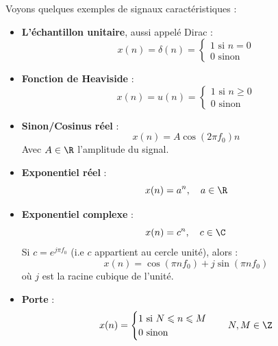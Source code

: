 \begin{example}
    Voyons quelques exemples de signaux caractéristiques : 
    \begin{itemize}
        \item \textbf{L'échantillon unitaire}, aussi appelé Dirac : 
            \begin{equation}
                x(n) = \delta(n) = 
                    \begin{cases}
                        1 \text{ si } n = 0 \\ 
                        0 \text{ sinon } 
                    \end{cases}
            \end{equation}
        \item \textbf{Fonction de Heaviside} : 
            \begin{equation}
                x(n) = u(n) = 
                    \begin{cases}
                        1 \text{ si }n \geqslant 0 \\
                        0 \text{ sinon}  
                    \end{cases}
            \end{equation}
        \item \textbf{Sinon/Cosinus réel} : 
            \begin{equation}
                x(n) = A \cos (2 \pi f_0)n 
            \end{equation}
            Avec $A \in \R$ l'amplitude du signal. 
        \item \textbf{Exponentiel réel} : 
            \begin{equation}
                x(n) = a^n, \quad a \in \R 
            \end{equation}
        \item \textbf{Exponentiel complexe} : 
            \begin{equation}
                x(n) = c^n, \quad c \in \C
            \end{equation}
            Si $c = e^{j \pi f_0}$ (i.e $c$ appartient au cercle unité), alors : 
                $$ x(n) = \cos ( \pi n f_0) + j \sin ( \pi n f_0) $$ 
            où $j$ est la racine cubique de l'unité. 
        \item \textbf{Porte} : 
            \begin{equation}
                x(n) = 
                \begin{cases}
                    1 \text{ si } N \leqslant n \leqslant M \\ 
                    0 \text{ sinon }  
                \end{cases}
                \quad N, M \in \Z 
            \end{equation}
    \end{itemize}
\end{example}

